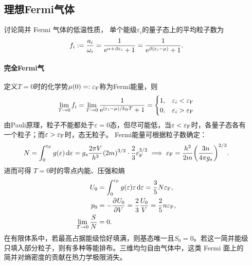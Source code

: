 \subsection{理想Fermi气体}

讨论简并 Fermi 气体的低温性质，
单个能级$\varepsilon_i$的量子态上的平均粒子数为
\begin{equation}
	\label{eq:sm-fermi-occupation}
	f_i := \frac{a_i}{\omega_i} = \frac1{\mathop{}\!\mathrm{e}^{\alpha+\beta\varepsilon_i} + 1} = \frac1{\mathop{}\!\mathrm{e}^{\beta(\varepsilon_i-\mu)} + 1}.
\end{equation}

\paragraph{完全Fermi气}

定义$T = 0$时的化学势$\mu(0) =: \varepsilon_\mathrm F$称为Fermi能量，则
\begin{equation}
	\label{eq:sm-zero-temperature-fermi-step}
	\lim_{T\to0}f_i = \lim_{T\to0}\frac1{\mathop{}\!\mathrm{e}^{(\varepsilon_i-\mu)/k_{\mathrm{B}} T} + 1} =
	\begin{cases}
		1,&\varepsilon_i < \varepsilon_\mathrm F\\
		0,&\varepsilon_i > \varepsilon_\mathrm F
	\end{cases}
\end{equation}
由Pauli原理，粒子不能都处于$\varepsilon = 0$态，但尽可能低，当$\varepsilon < \varepsilon_\mathrm F$时，各量子态各有一个粒子；而$\varepsilon > \varepsilon_\mathrm F$时，态无粒子。
Fermi能量可根据粒子数确定：
\begin{equation}
	N = \int_0^{\varepsilon_\mathrm F}g(\varepsilon)\mathop{}\!\mathrm{d}\varepsilon = g_s\frac{2\pi V}{h^3}(2m)^{3/2} \cdot \frac23\varepsilon_\mathrm F^{3/2}
	\implies
	\varepsilon_\mathrm F = \frac{h^2}{2m}\biggl(\frac{3n}{4\pi g_s}\biggr)^{2/3}.
\end{equation}
进而可得
$T = 0$时的零点内能、压强和熵
\begin{subequations}
	\begin{align}
		U_0 &= \int_0^{\varepsilon_\mathrm F}g(\varepsilon)\varepsilon\mathop{}\!\mathrm{d}\varepsilon = \frac35N\varepsilon_\mathrm F,\\
		p_0 &= -\frac{\partial^{}U_0}{\partial{V}^{}} = \frac23\frac{U_0}V = \frac25n\varepsilon_\mathrm F,\\
		\lim_{T\to0}\frac SN &= 0.
	\end{align}
\end{subequations}
在有限体系中，若最高占据能级恰好填满，则基态唯一且$S_0 = 0$。若这一简并能级只填入部分粒子，则有多种等能排布。三维均匀自由气体中，这类 Fermi 面上的简并对熵密度的贡献在热力学极限消失。

